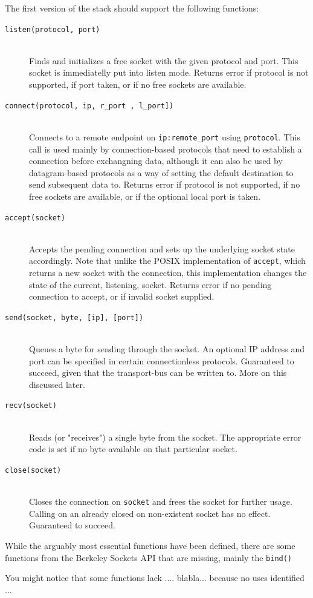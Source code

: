The first version of the stack should support the following functions:
\begin{description}
\item[\texttt{listen(protocol, port)}]\hfill\\
    Finds and initializes a free socket with the given protocol and port. This 
    socket is immediatelly put into listen mode.
    Returns error if protocol is not supported, if port taken, or if no free sockets 
    are available.
\item[\texttt{connect(protocol, ip, r\_port , l\_port])}]\hfill\\
    Connects to a remote endpoint on \texttt{ip:remote\_port} using \texttt{protocol}.
    This call is used mainly by connection-based protocols that need to 
    establish a connection before exchangning data, although it can also be used 
    by datagram-based protocols as a way of setting the default destination to
    send subsequent data to.
    Returns error if protocol is not supported, if no free sockets are available,
    or if the optional local port is taken.

\item[\texttt{accept(socket)}]\hfill\\
    Accepts the pending connection and sets up the underlying socket state 
    accordingly. Note that unlike the POSIX implementation of \texttt{accept},
    which returns a new socket with the connection, this implementation changes 
    the state of the current, listening, socket.
    Returns error if no pending connection to accept, or if invalid socket 
    supplied.

\item[\texttt{send(socket, byte, [ip], [port])}]\hfill\\
    Queues a byte for sending through the socket. An optional IP address and 
    port can be specified in certain connectionless protocols. 
    Guaranteed to succeed, given that the transport-bus can be written to. More 
    on this discussed later.  
\item[\texttt{recv(socket)}]\hfill\\
    Reads (or "receives") a single byte from the socket. The appropriate error
    code is set if no byte available on that particular socket.

\item[\texttt{close(socket)}]\hfill\\
    Closes the connection on \texttt{socket} and frees the socket for further 
    usage. Calling on an already closed on non-existent socket has no effect.
    Guaranteed to succeed.

\end{description}

While the arguably most essential functions have been defined, there are some 
functions from the Berkeley Sockets API that are missing, mainly the 
\texttt{bind()}

You might notice that some functions lack .... blabla... because no uses identified ...




